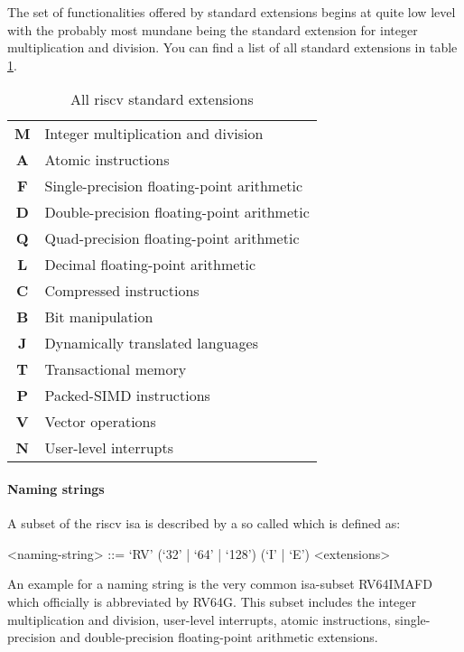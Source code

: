 The set of functionalities offered by standard extensions begins at quite low level with the probably most mundane being the standard extension for integer multiplication and division.
You can find a list of all standard extensions in table \ref{tbl:rv-exts}.

\begin{table}
    \centering
    \begin{tabular}{| c | l |}
        \hline
        \textbf{M} & Integer multiplication and division \\
        \textbf{A} & Atomic instructions \\
        \textbf{F} & Single-precision floating-point arithmetic \\
        \textbf{D} & Double-precision floating-point arithmetic \\
        \textbf{Q} & Quad-precision floating-point arithmetic \\
        \textbf{L} & Decimal floating-point arithmetic \\
        \textbf{C} & Compressed instructions \\
        \textbf{B} & Bit manipulation \\
        \textbf{J} & Dynamically translated languages \\
        \textbf{T} & Transactional memory \\
        \textbf{P} & Packed-SIMD instructions \\
        \textbf{V} & Vector operations \\
        \textbf{N} & User-level interrupts \\
        \hline
    \end{tabular}
    \caption{All \gls{riscv} standard extensions}
    \label{tbl:rv-exts}
\end{table}

\paragraph{Naming strings}
A subset of the \gls{riscv} \gls{isa} is described by a so called  which is defined as:

\begin{grammar}
    <naming-string> ::= `RV' (`32' | `64' | `128') (`I' | `E') <extensions>
\end{grammar}

An example for a naming string is the very common \gls{isa}-subset RV64IMAFD which officially is abbreviated by RV64G.
This subset includes the integer multiplication and division, user-level interrupts, atomic instructions, single-precision and double-precision floating-point arithmetic extensions.

